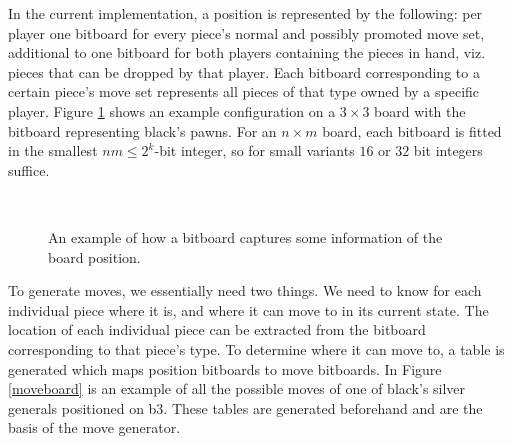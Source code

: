 \documentclass{article}
\begin{document}
In the current implementation, a position is represented by the following: per player one bitboard for every piece's normal and possibly promoted move set, 
additional to one bitboard for both players containing the pieces in hand, viz. pieces that can be dropped by that player.
Each bitboard corresponding to a certain piece's move set represents all pieces of that type
owned by a specific player. Figure \ref{bitboard} shows an example configuration on a $3 \times 3$ board with the
bitboard representing black's pawns. For an $n \times m$ board, each bitboard is fitted in the smallest $nm \leq 2^k$-bit integer, so for small
variants $16$ or $32$ bit integers suffice.

\begin{figure}[h]
\center

    \mbox{
       \quad
      }

\caption{An example of how a bitboard captures some information of the board position.}
\label{bitboard}
\end{figure}

To generate moves, we essentially need two things. We need to know for each individual piece where it is, and where it can move to in its current state.
The location of each individual piece can be extracted from the bitboard corresponding to that piece's type. To determine where it can move to, a table
is generated which maps position bitboards to move bitboards. In Figure \ref{moveboard} is an example of all the possible moves of one of black's silver
generals positioned on b3. These tables are generated beforehand and are the basis of the move generator.
\end{document}
